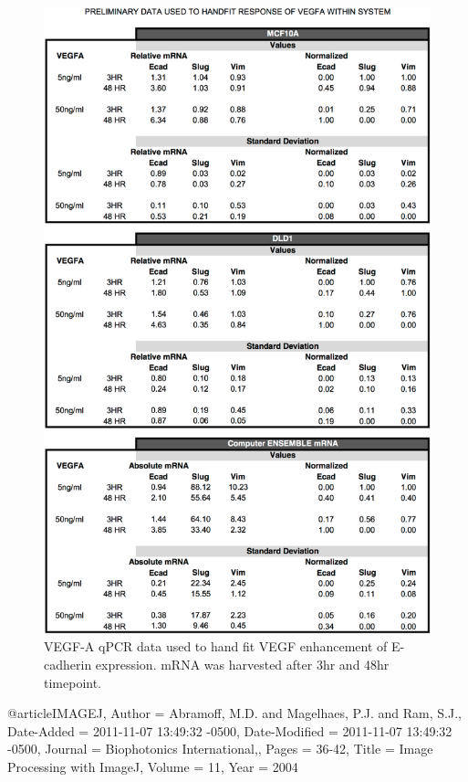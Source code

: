 \newpage

\begin{figure}
	\center
	\includegraphics [width=0.75\linewidth] {./figs/Fig-Supplemental-Data-VEGFA.pdf}
	\caption{VEGF-A qPCR data used to hand fit VEGF enhancement of E-cadherin expression. mRNA was harvested after 3hr and 48hr timepoint.}\label{fg:VEGFA-Data}
\end{figure}


%


@article{IMAGEJ,
	Author = {Abramoff, M.D. and Magelhaes, P.J. and Ram, S.J.},
	Date-Added = {2011-11-07 13:49:32 -0500},
	Date-Modified = {2011-11-07 13:49:32 -0500},
	Journal = {Biophotonics International,},
	Pages = {36-42},
	Title = {Image Processing with ImageJ},
	Volume = {11},
	Year = {2004}}


